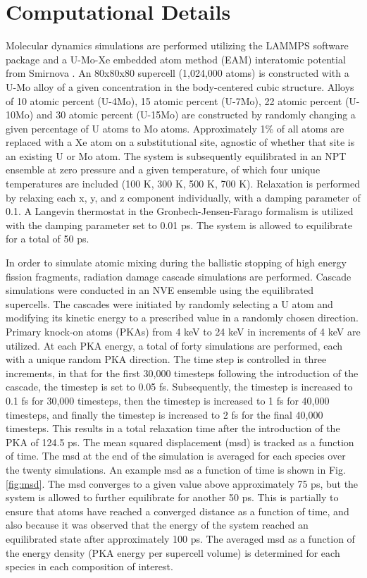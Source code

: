 \documentclass[review]{elsarticle}
\begin{document}
\section{Computational Details}

Molecular dynamics simulations are performed utilizing the LAMMPS \cite{plimpton1995} software package and a U-Mo-Xe embedded atom method (EAM) interatomic potential from Smirnova \cite{smirnovaUMo}. An 80x80x80 supercell (1,024,000 atoms) is constructed with a U-Mo alloy of a given concentration in the body-centered cubic structure. Alloys of 10 atomic percent (U-4Mo), 15 atomic percent (U-7Mo), 22 atomic percent (U-10Mo) and 30 atomic percent (U-15Mo) are constructed by randomly changing a given percentage of U atoms to Mo atoms. Approximately 1\% of all atoms are replaced with a Xe atom on a substitutional site, agnostic of whether that site is an existing U or Mo atom. The system is subsequently equilibrated in an NPT ensemble at zero pressure and a given temperature, of which four unique temperatures are included (100 K, 300 K, 500 K, 700 K). Relaxation is performed by relaxing each x, y, and z component individually, with a damping parameter of 0.1. A Langevin thermostat in the Gronbech-Jensen-Farago \cite{gjf2013, gjf2014} formalism is utilized with the damping parameter set to 0.01 ps. The system is allowed to equilibrate for a total of 50 ps.

In order to simulate atomic mixing during the ballistic stopping of high energy fission fragments, radiation damage cascade simulations are performed. Cascade simulations were conducted in an NVE ensemble using the equilibrated supercells. The cascades were initiated by randomly selecting a U atom and modifying its kinetic energy to a prescribed value in a randomly chosen direction. Primary knock-on atoms (PKAs) from 4 keV to 24 keV in increments of 4 keV are utilized. At each PKA energy, a total of forty simulations are performed, each with a unique random PKA direction. The time step is controlled in three increments, in that for the first 30,000 timesteps following the introduction of the cascade, the timestep is set to 0.05 fs. Subsequently, the timestep is increased to 0.1 fs for 30,000 timesteps, then the timestep is increased to 1 fs for 40,000 timesteps, and finally the timestep is increased to 2 fs for the final 40,000 timesteps. This results in a total relaxation time after the introduction of the PKA of 124.5 ps. The mean squared displacement (msd) is tracked as a function of time. The msd at the end of the simulation is averaged for each species over the twenty simulations. An example msd as a function of time is shown in Fig. \ref{fig:msd}. The msd converges to a given value above approximately 75 ps, but the system is allowed to further equilibrate for another 50 ps. This is partially to ensure that atoms have reached a converged distance as a function of time, and also because it was observed that the energy of the system reached an equilibrated state after approximately 100 ps. The averaged msd as a function of the energy density (PKA energy per supercell volume) is determined for each species in each composition of interest. 
\end{document}
